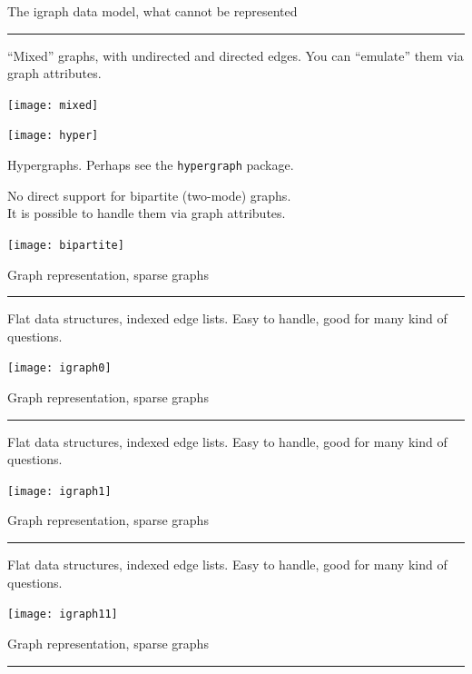 \documentclass[landscape]{foils}
\newcommand{\stitle}[1]{{\centering\color{blue}\Large #1\par\vspace*{10pt}\hrule}}
\begin{document}
\newpage
\stitle{The igraph data model, what cannot be represented}

\begin{minipage}{0.6\textwidth}
  ``Mixed'' graphs, with undirected and directed edges.
  You can ``emulate'' them via graph attributes.
\end{minipage}\begin{minipage}{0.3\textwidth}
  \texttt{[image: mixed]}
\end{minipage} \par \pause
\vspace*{-1cm}
{\raggedleft
\begin{minipage}{0.3\textwidth}
  \raggedleft
  \texttt{[image: hyper]}
\end{minipage}\begin{minipage}{0.6\textwidth}
  Hypergraphs. Perhaps see the \texttt{hypergraph} package.
\end{minipage} \par
} \pause
\begin{minipage}{0.6\textwidth}
No direct support for bipartite (two-mode) graphs.\\
  It is possible to handle them via graph attributes.
\end{minipage}\begin{minipage}{0.3\textwidth}
  \texttt{[image: bipartite]}
\end{minipage}

\newpage
\stitle{Graph representation, sparse graphs}

Flat data structures, indexed edge lists. Easy to
handle, good for many kind of questions.
\begin{center}
  \texttt{[image: igraph0]}
\end{center}

\newpage
\stitle{Graph representation, sparse graphs}

Flat data structures, indexed edge lists. Easy to
handle, good for many kind of questions.
\begin{center}
  \texttt{[image: igraph1]}
\end{center}

\newpage
\stitle{Graph representation, sparse graphs}

Flat data structures, indexed edge lists. Easy to
handle, good for many kind of questions.
\begin{center}
  \texttt{[image: igraph11]}
\end{center}

\newpage
\stitle{Graph representation, sparse graphs}
\end{document}
